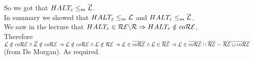 So we got that \underline{$HALT_\varepsilon \leq_m \overline{\mathcal{L}}$}. \\

In summary we showed that $HALT_\varepsilon \leq_m \mathcal{L}$ and $HALT_\varepsilon \leq_m \overline{\mathcal{L}}$. \\
We saw in the lecture that $HALT_\varepsilon \in \mathcal{R}\mathcal{E} \backslash \mathcal{R} \Rightarrow HALT_\varepsilon \notin co\mathcal{R}\mathcal{E}$, \\
Therefore $\mathcal{L} \notin co\mathcal{R}\mathcal{E} \wedge \overline{\mathcal{L}} \notin co\mathcal{R}\mathcal{E} \Rightarrow \mathcal{L} \notin co\mathcal{R}\mathcal{E} \wedge  \mathcal{L} \notin \mathcal{R}\mathcal{E}
        \Rightarrow \mathcal{L} \in \overline{co\mathcal{R}\mathcal{E}} \wedge \mathcal{L} \in \overline{\mathcal{R}\mathcal{E}} \\
        \Rightarrow \mathcal{L} \in \overline{co\mathcal{R}\mathcal{E}} \cap \overline{\mathcal{R}\mathcal{E}} = \overline{\mathcal{R}\mathcal{E} \cup co\mathcal{R}\mathcal{E}}$ (from De Morgan). As required. \\


